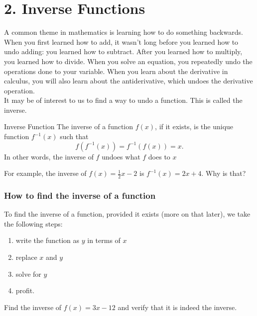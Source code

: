 \documentclass[12pt,fleqn]{book}
\begin{document}
\chapter{2. Inverse Functions}
A common theme in mathematics is learning how to do something backwards.  When you first learned how to add, it wasn't long before you learned how to undo adding: you learned how to subtract.  After you learned how to multiply, you learned how to divide.  When you solve an equation, you repeatedly undo the operations done to your variable.  When you learn about the derivative in calculus, you will also learn about the antiderivative, which undoes the derivative operation.
\\[1em]
It may be of interest to us to find a way to undo a function.  This is called the inverse.
\begin{defn}{Inverse Function}{}
    The inverse of a function $f(x)$, if it exists, is the unique function $f^{-1}(x)$ such that 
    \[
        f(f^{-1}(x))=f^{-1}(f(x))=x.
    \]
    In other words, the inverse of $f$ undoes what $f$ does to $x$
\end{defn}
For example, the inverse of $f(x)=\frac12 x - 2$ is $f^{-1}(x)=2x+4$.  Why is that?
\subsection*{How to find the inverse of a function}
To find the inverse of a function, provided it exists (more on that later), we take the following steps:
\begin{enumerate}
    \item write the function as $y$ in terms of $x$
    \item replace $x$ and $y$
    \item solve for $y$
    \item profit.
\end{enumerate}
Find the inverse of $f(x)=3x-12$ and verify that it is indeed the inverse.
\\[2in]
\end{document}
